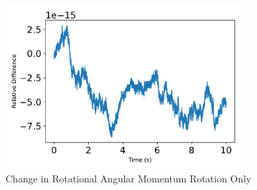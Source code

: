 \begin{figure}[htbp]\centerline{\includegraphics[width=0.8\textwidth]{AutoTeX/scPlusChangeInRotationalAngularMomentumRotationOnly}}\caption{Change in Rotational Angular Momentum Rotation Only}\label{fig:scPlusChangeInRotationalAngularMomentumRotationOnly}\end{figure}